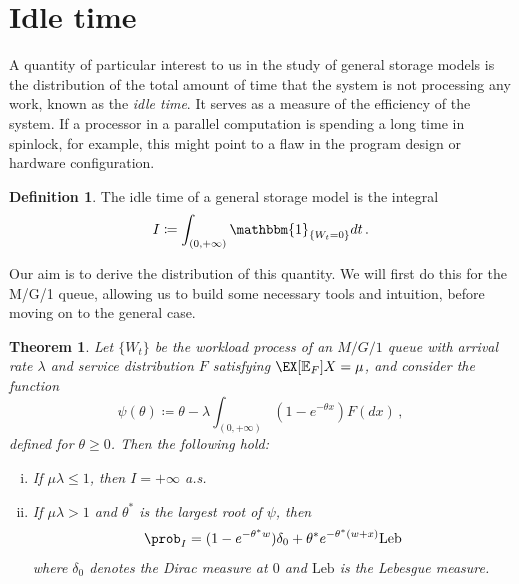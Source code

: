 \documentclass[titlepage]{article}
\theoremstyle{plain}
\newtheorem{theorem}{Theorem}[section]
\theoremstyle{definition}
\newtheorem{definition}{Definition}[section]
\begin{document}
\section{Idle time} \label{sec:idle-time}

A quantity of particular interest to us in the study of general storage models is the distribution of the total amount of time that the system is not processing any work, known as the \emph{idle time}. It serves as a measure of the efficiency of the system. If a processor in a parallel computation is spending a long time in spinlock, for example, this might point to a flaw in the program design or hardware configuration.

\begin{definition}
  The idle time of a general storage model is the integral
  \begin{equation}
    I \coloneqq \int_{(0, +\infty)} \mathbbm{1}_{\{ W_t = 0 \}} dt \,.
  \end{equation}
\end{definition}

Our aim is to derive the distribution of this quantity. We will first do this for the M/G/1 queue, allowing us to build some necessary tools and intuition, before moving on to the general case.

\begin{theorem} \label{thm:pois-idle-time}
  Let $\{ W_t \}$ be the workload process of an $M/G/1$ queue with arrival rate $\lambda$ and service distribution $F$ satisfying $\EX[\mathbb{E}_F]{X} = \mu$, and consider the function
  \begin{equation} \label{eq:psi-func}
    \psi(\theta) \coloneqq \theta - \lambda \int_{(0, +\infty)} \left( 1 - e^{-\theta x} \right) F(dx)  \,,
  \end{equation}
  defined for $\theta \geq 0$. Then the following hold:
  \begin{enumerate}[(i)]
    \item \label{pois_idle_time-i}
          If $\mu \lambda \leq 1$, then $I = +\infty$ a.s.
    \item \label{pois_idle_time-ii}
          If $\mu \lambda > 1$ and $\theta^*$ is the largest root of $\psi$, then
          \begin{equation}
            \prob_I = (1 - e^{-\theta^* w}) \delta_0 + \theta^* e^{-\theta^*{(w + x)}} \mathrm{Leb}
          \end{equation}
          where $\delta_0$ denotes the Dirac measure at $0$ and $\mathrm{Leb}$ is the Lebesgue measure.
  \end{enumerate}
\end{theorem}
\end{document}
